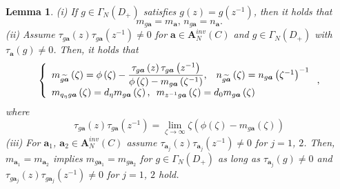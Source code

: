 \documentclass[a4paper]{article}%
\newtheorem{lemma}{Lemma}
\begin{document}
\begin{lemma}
\label{l2-12}(i) If $g\in\Gamma_{N}\left(  D_{+}\right)  $ satisfies
$g(z)=g\left(  z^{-1}\right)  $, then it holds that%
\[
m_{g\boldsymbol{a}}=m_{\boldsymbol{a}}\text{, \ }n_{g\boldsymbol{a}%
}=n_{\boldsymbol{a}}\text{.}%
\]
(ii) Assume $\tau_{g\boldsymbol{a}}\left(  z\right)  \tau_{g\boldsymbol{a}%
}\left(  z^{-1}\right)  \neq0$ for $\boldsymbol{a}\in\boldsymbol{A}_{N}%
^{inv}\left(  C\right)  $ and $g\in\Gamma_{N}\left(  D_{+}\right)  $ with
$\tau_{\boldsymbol{a}}\left(  g\right)  \neq0$. Then, it holds that
\begin{equation}
\left\{
\begin{array}
[c]{l}%
m_{\widetilde{g\boldsymbol{a}}}\left(  \zeta\right)  =\phi\left(
\zeta\right)  -\dfrac{\tau_{g\boldsymbol{a}}\left(  z\right)  \tau
_{g\boldsymbol{a}}\left(  z^{-1}\right)  }{\phi\left(  \zeta\right)
-m_{g\boldsymbol{a}}\left(  \zeta^{-1}\right)  }\text{, \ \ }n_{\widetilde
{g\boldsymbol{a}}}\left(  \zeta\right)  =n_{g\boldsymbol{a}}\left(  \zeta
^{-1}\right)  ^{-1}\\
m_{q_{\eta}g\boldsymbol{a}}\left(  \zeta\right)  =d_{\eta}m_{g\boldsymbol{a}%
}\left(  \zeta\right)  \text{, \ }m_{z^{-1}g\boldsymbol{a}}\left(
\zeta\right)  =d_{0}m_{g\boldsymbol{a}}\left(  \zeta\right)
\end{array}
\right.  \text{,} \label{2-29}%
\end{equation}
where%
\begin{equation}
\tau_{g\boldsymbol{a}}\left(  z\right)  \tau_{g\boldsymbol{a}}\left(
z^{-1}\right)  =\lim_{\zeta\rightarrow\infty}\zeta\left(  \phi\left(
\zeta\right)  -m_{g\boldsymbol{a}}(\zeta)\right)  \label{2-30}%
\end{equation}
(iii) For $\boldsymbol{a}_{1}$, $\boldsymbol{a}_{2}\in\boldsymbol{A}_{N}%
^{inv}\left(  C\right)  $ assume $\tau_{\boldsymbol{a}_{j}}\left(  z\right)
\tau_{\boldsymbol{a}_{j}}\left(  z^{-1}\right)  \neq0$ for $j=1$, $2$. Then,
$m_{\boldsymbol{a}_{1}}=m_{\boldsymbol{a}_{2}}$ implies $m_{g\boldsymbol{a}%
_{1}}=m_{g\boldsymbol{a}_{2}}$ for $g\in\Gamma_{N}\left(  D_{+}\right)  $ as
long as $\tau_{\boldsymbol{a}_{j}}\left(  g\right)  \neq0$ and $\tau
_{g\boldsymbol{a}_{j}}\left(  z\right)  \tau_{g\boldsymbol{a}_{j}}\left(
z^{-1}\right)  \neq0$ for $j=1$, $2$ hold.
\end{lemma}
\end{document}

